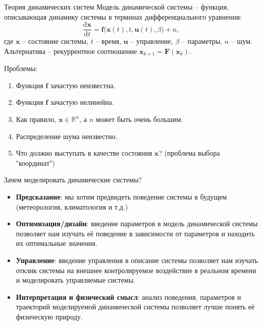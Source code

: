 \begin{frame}{Теория динамических систем}
Модель динамической системы -- функция, описывающая динамику системы в терминах дифференциального уравнения:
$$ \frac{\text{d}\mathbf{x}}{\text{d}t} = \mathbf{f}\Big(\mathbf{x}(t), t, \mathbf{u}(t), \beta \Big) + n, $$
где $\mathbf{x}$ -- состояние системы, $t$ -- время, $\mathbf{u}$ -- управление, $\beta$ -- параметры, $n$ -- шум. \\
Альтернатива -- рекуррентное соотношение $\mathbf{x}_{k+1} = \mathbf{F}
(\mathbf{x}_k)$.

Проблемы:
\begin{enumerate}
    \item Функция $\mathbf{f}$ зачастую неизвестна.
    \item Функция $\mathbf{f}$ зачастую нелинейна.
    \item Как правило, $\mathbf{x} \in \mathbb{R}^n$, а $n$ может быть очень большим.
    \item Распределение шума неизвестно.
    \item Что должно выступать в качестве состояния $\mathbf{x}$? (проблема выбора "координат")
\end{enumerate}
\end{frame}
\begin{frame}{Зачем моделировать динамические системы?}

\begin{itemize}
\item \textbf{Предсказание}: мы хотим предвидеть поведение системы в будущем (метеорология, климатология и т.д.)
\item \textbf{Оптимизация/дизайн}: введение параметров в модель динамической системы позволяет нам изучать её поведение в зависимости от параметров и находить их оптимальные значения.
\item \textbf{Управление}: введение управления в описание системы позволяет нам изучать отклик системы на внешнее контролируемое воздействие в реальном времени и моделировать управляемые системы.
\item \textbf{Интерпретация и физический смысл}: анализ поведения, параметров и траекторий моделируемой динамической системы позволяет лучше понять её физическую природу. 
\end{itemize}
\end{frame}
